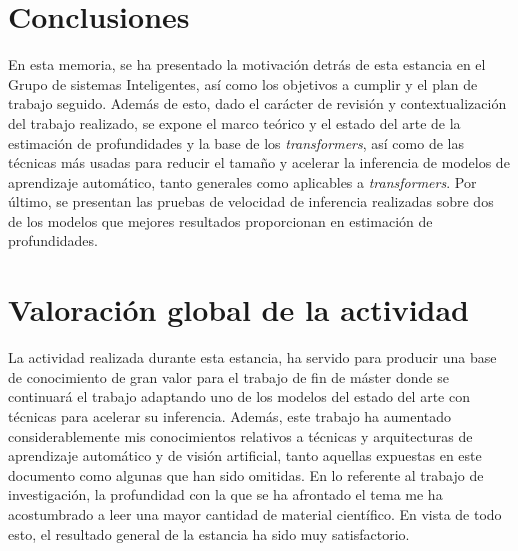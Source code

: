 \documentclass[a4paper]{article}
\begin{document}
\section{Conclusiones}
En esta memoria, se ha presentado la motivación detrás de esta estancia en el Grupo de sistemas Inteligentes, así como los objetivos a cumplir y el plan de trabajo seguido. Además de esto, dado el carácter de revisión y contextualización del trabajo realizado, se expone el marco teórico y el estado del arte de la estimación de profundidades y la base de los \textit{transformers}, así como de las técnicas más usadas para reducir el tamaño y acelerar la inferencia de modelos de aprendizaje automático, tanto generales como aplicables a \textit{transformers}. Por último, se presentan las pruebas de velocidad de inferencia realizadas sobre dos de los modelos que mejores resultados proporcionan en estimación de profundidades.

\section{Valoración global de la actividad}
La actividad realizada durante esta estancia, ha servido para producir una base de conocimiento de gran valor para el trabajo de fin de máster donde se continuará el trabajo adaptando uno de los modelos del estado del arte con técnicas para acelerar su inferencia. Además, este trabajo ha aumentado considerablemente mis conocimientos relativos a técnicas y arquitecturas de aprendizaje automático y de visión artificial, tanto aquellas expuestas en este documento como algunas que han sido omitidas. En lo referente al trabajo de investigación, la profundidad con la que se ha afrontado el tema me ha acostumbrado a leer una mayor cantidad de material científico. En vista de todo esto, el resultado general de la estancia ha sido muy satisfactorio.

% 

\clearpage


\clearpage
\appendix
\end{document}
